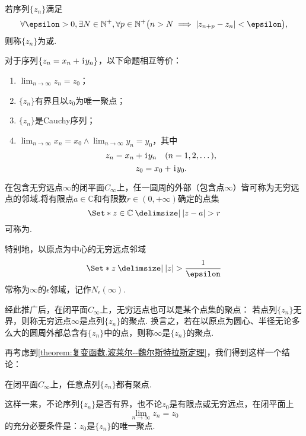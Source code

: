 \begin{definition}
若序列\(\{z_n\}\)满足\[
\forall \epsilon > 0, \exists N \in \mathbb{N}^+, \forall p\in\mathbb{N}^+ \bigl(
n > N  \implies  \abs{z_{n+p} - z_n} < \epsilon
\bigr),
\]则称\(\{z_n\}\)为或.
\end{definition}

\begin{theorem}
对于序列\(\{z_n = x_n + \kern1pt\mathrm{i}\kern1pt y_n\}\)，以下命题相互等价：
\begin{enumerate}
\item \(\lim_{n \to \infty} z_n = z_0\)；

\item \(\{z_n\}\)有界且以\(z_0\)为唯一聚点；

\item \(\{z_n\}\)是Cauchy序列；

\item \(\lim_{n \to \infty} x_n = x_0 \land \lim_{n \to \infty} y_n = y_0\)，其中\[
z_n = x_n + \kern1pt\mathrm{i}\kern1pt y_n \quad(n = 1,2,\dotsc),
\]\[
z_0 = x_0 + \kern1pt\mathrm{i}\kern1pt y_0.
\]
\end{enumerate}
\end{theorem}

\begin{definition}
在包含无穷远点\(\infty\)的闭平面\(C_\infty\)上，任一圆周的外部（包含点\(\infty\)）皆可称为无穷远点的邻域.将有限点\(a\in\mathbb{C}\)和有限数\(r\in(0,+\infty)\)确定的点集\[
\Set*{ z\in\mathbb{C} \given \abs{z-a}>r }
\]可称为.

特别地，以原点为中心的无穷远点邻域\[
\Set*{ z \given \abs{z} > \frac{1}{\epsilon} }
\]常称为\(\infty\)的\(\epsilon\)邻域，记作\(N_{\epsilon}(\infty)\).
\end{definition}
经此推广后，在闭平面\(C_\infty\)上，无穷远点也可以是某个点集的聚点：
若点列\(\{z_n\}\)无界，则称无穷远点\(\infty\)是点列\(\{z_n\}\)的聚点.
换言之，若在以原点为圆心、半径无论多么大的圆周外部总含有\(\{z_n\}\)中的点，则称\(\infty\)是\(\{z_n\}\)的聚点.

再考虑到\cref{theorem:复变函数.波莱尔--魏尔斯特拉斯定理}，我们得到这样一个结论：
\begin{theorem}
在闭平面\(C_\infty\)上，任意点列\(\{z_n\}\)都有聚点.
\end{theorem}
这样一来，不论序列\(\{z_n\}\)是否有界，也不论\(z_0\)是有限点或无穷远点，在闭平面上\[
\lim_{n\to\infty} z_n = z_0
\]的充分必要条件是：\(z_0\)是\(\{z_n\}\)的唯一聚点.

